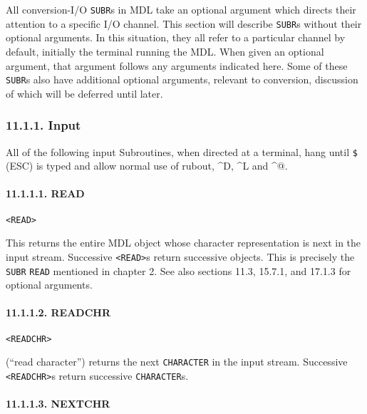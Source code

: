 \documentclass[a4paper,]{article}
\let\oldparagraph\paragraph
\renewcommand{\paragraph}[1]{\oldparagraph{#1}\mbox{}}
\begin{document}
All conversion-I/O \texttt{SUBR}s in MDL take an optional argument which directs their attention to a specific I/O channel.
This section will describe \texttt{SUBR}s without their optional arguments. In this situation, they all refer to a
particular channel by default, initially the terminal running the MDL. When given an optional argument, that argument
follows any arguments indicated here. Some of these \texttt{SUBR}s also have additional optional arguments, relevant to
conversion, discussion of which will be deferred until later.

\subsubsection{11.1.1. Input}\label{input}

All of the following input Subroutines, when directed at a terminal, hang until \texttt{\$} \index{\texttt{\$}} (ESC) is
typed and allow normal use of rubout, \^{}D, \^{}L and
\^{}@.

\paragraph{11.1.1.1. READ}\label{read}

\begin{verbatim}
<READ>
\end{verbatim}

 This returns the entire MDL object whose character representation is next in the input stream.
Successive \texttt{\textless{}READ\textgreater{}}s return successive objects. This is precisely the \texttt{SUBR}
\texttt{READ} mentioned in chapter 2. See also sections 11.3, 15.7.1, and 17.1.3 for optional arguments.

\paragraph{11.1.1.2. READCHR}\label{readchr}

\begin{verbatim}
<READCHR>
\end{verbatim}

 (``read character'') returns the next \texttt{CHARACTER} in the input stream. Successive
\texttt{\textless{}READCHR\textgreater{}}s return successive \texttt{CHARACTER}s.

\paragraph{11.1.1.3. NEXTCHR}\label{nextchr}
\end{document}
